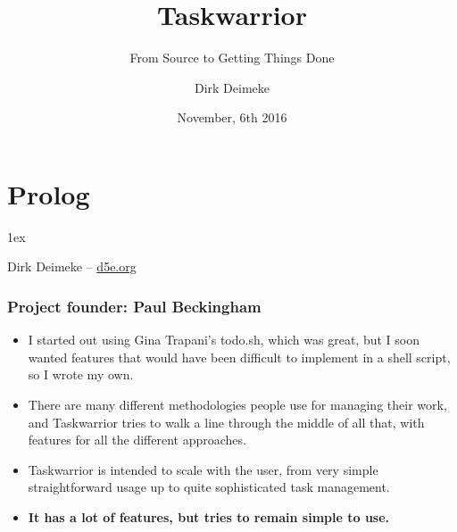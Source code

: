 \documentclass[t,handout]{beamer}
\title{Taskwarrior}
\subtitle{From Source to Getting Things Done}
\date{November, 6th 2016}
\author{Dirk Deimeke}
\institute{Taskwarrior Academy / OpenRheinRuhr 2016}
\begin{document}
\begin{frame}
    \titlepage
\end{frame}





\section{Prolog}

\parskip1ex

\begin{frame}[standout]
    Dirk Deimeke -- \href{https://d5e.org/}{d5e.org}
\end{frame}

\begin{frame}[fragile]\frametitle{Project founder: Paul Beckingham}
    \vfill
    \pause
    \begin{itemize}
        \item I started out using Gina Trapani's todo.sh, which was great, but I soon wanted features that would have been difficult to implement in a shell script, so I wrote my own. \pause
        \item There are many different methodologies people use for managing their work, and Taskwarrior tries to walk a line through the middle of all that, with features for all the different approaches. \pause
        \item Taskwarrior is intended to scale with the user, from very simple straightforward usage up to quite sophisticated task management. \pause
        \item \textbf{It has a lot of features, but tries to remain simple to use.}
    \end{itemize}
\end{frame}
\end{document}
